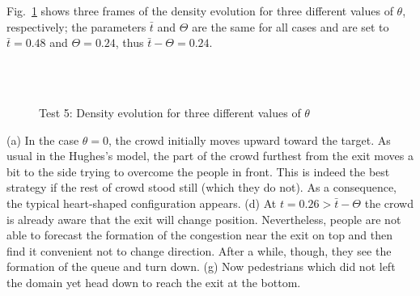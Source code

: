 \documentclass{cmslatex}
\begin{document}
Fig.\ \ref{fig:test5} shows three frames of the density evolution for three different values of $\theta$, respectively; the parameters $\bar t$ and $\Theta$ are the same for all cases and are set to $\bar t=0.48$ and $\Theta=0.24$, thus $\bar t-\Theta=0.24$.
%
\begin{figure}[h!]
\centering
\hspace{0 mm}
\hspace{0 mm}
\\
\vspace{0 mm}
\hspace{0 mm}
\hspace{0 mm}
\\
\vspace{0 mm}
\hspace{0 mm}
\hspace{0 mm}
\caption{Test 5: Density evolution for three different values of $\theta$}
\label{fig:test5}
\end{figure}

(a) In the case $\theta=0$, the crowd initially moves upward toward the target. As usual in the Hughes's model, the part of the crowd furthest from the exit moves a bit to the side trying to overcome the people in front. This is indeed the best strategy if the rest of crowd stood still (which they do not). As a consequence, the typical heart-shaped configuration appears. 
(d) At $t=0.26>\bar t-\Theta$ the crowd is already aware that the exit will change position. Nevertheless, people are not able to forecast the formation of the congestion near the exit on top and then find it convenient not to change direction. After a while, though, they see the formation of the queue and turn down. 
(g) Now pedestrians which did not left the domain yet head down to reach the exit at the bottom.
\end{document}
